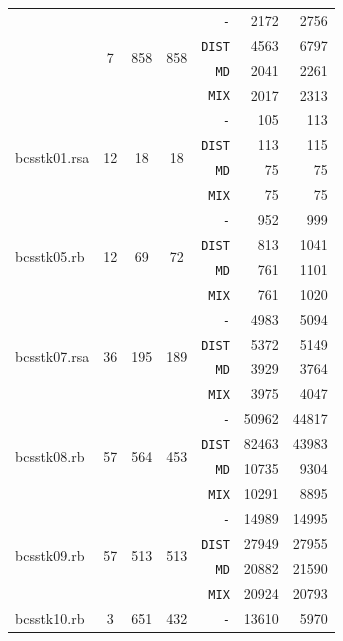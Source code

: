 \documentclass[11pt,american,czech,oneside]{book}
\theoremstyle{plain}
\theoremstyle{definition}
\begin{document}
{\begin{longtable}{|l|c|c|c|r|r|r|}
    &	\multirow{4}{*}{7}	&	\multirow{4}{*}{858}	&	\multirow{4}{*}{858}	&\texttt{-}    &	2172	&	2756	\\
    & & & &\texttt{DIST} &	4563	&	6797	\\
    & & & &\texttt{MD}   &	2041	&	2261	\\
    & & & &\texttt{MIX}  &	2017	&	2313	\\
    \hline
  \multirow{4}{*}{bcsstk01.rsa	}
    &	\multirow{4}{*}{12}	&	\multirow{4}{*}{18}	&	\multirow{4}{*}{18}	&\texttt{-}    &	105	&	113	\\
    & & & &\texttt{DIST} &	113	&	115	\\
    & & & &\texttt{MD}   &	75	&	75	\\
    & & & &\texttt{MIX}  &	75	&	75	\\
    \hline
  \multirow{4}{*}{bcsstk05.rb	}
    &	\multirow{4}{*}{12}	&	\multirow{4}{*}{69}	&	\multirow{4}{*}{72}	&\texttt{-}    &	952	&	999	\\
    & & & &\texttt{DIST} &	813	&	1041	\\
    & & & &\texttt{MD}   &	761	&	1101	\\
    & & & &\texttt{MIX}  &	761	&	1020	\\
    \hline
  \multirow{4}{*}{bcsstk07.rsa	}
    &	\multirow{4}{*}{36}	&	\multirow{4}{*}{195}	&	\multirow{4}{*}{189}	&\texttt{-}    &	4983	&	5094	\\
    & & & &\texttt{DIST} &	5372	&	5149	\\
    & & & &\texttt{MD}   &	3929	&	3764	\\
    & & & &\texttt{MIX}  &	3975	&	4047	\\
    \hline
  \multirow{4}{*}{bcsstk08.rb	}
    &	\multirow{4}{*}{57}	&	\multirow{4}{*}{564}	&	\multirow{4}{*}{453}	&\texttt{-}    &	50962	&	44817	\\
    & & & &\texttt{DIST} &	82463	&	43983	\\
    & & & &\texttt{MD}   &	10735	&	9304	\\
    & & & &\texttt{MIX}  &	10291	&	8895	\\
    \hline
  \multirow{4}{*}{bcsstk09.rb	}
    &	\multirow{4}{*}{57}	&	\multirow{4}{*}{513}	&	\multirow{4}{*}{513}	&\texttt{-}    &	14989	&	14995	\\
    & & & &\texttt{DIST} &	27949	&	27955	\\
    & & & &\texttt{MD}   &	20882	&	21590	\\
    & & & &\texttt{MIX}  &	20924	&	20793	\\
    \hline
  \multirow{4}{*}{bcsstk10.rb	}
    &	\multirow{4}{*}{3}	&	\multirow{4}{*}{651}	&	\multirow{4}{*}{432}	&\texttt{-}    &	13610	&	5970	\\

\end{longtable}}
\end{document}
